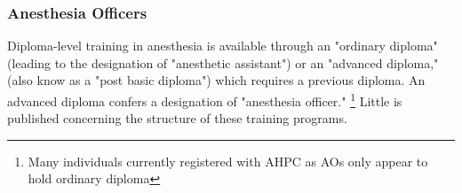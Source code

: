 \documentclass[12pt]{article} %
\begin{document}
\subsubsection{Anesthesia Officers}

Diploma-level training in anesthesia is available through an "ordinary diploma" (leading to the designation of "anesthetic assistant") or an "advanced diploma," (also know as a "post basic diploma") which requires a previous diploma. An advanced diploma confers a designation of "anesthesia officer." 
\footnote{Many individuals currently registered with AHPC as AOs only appear to hold ordinary diploma}
\citet{dsco2012}
Little is published concerning the structure of these training programs.
\end{document}

